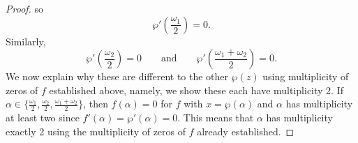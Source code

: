 \documentclass{article}
\theoremstyle{definition}
\theoremstyle{definition}
\theoremstyle{definition}
\begin{document}
\begin{proof}
so 
$$\wp'(\frac{\omega_1}2)=0.$$ Similarly, $$\wp'(\frac{\omega_2}2)=0\qquad \text{and}\qquad \wp'(\frac{\omega_1+\omega_2}2)=0.$$ 
We now explain why these are different to the other $\wp(z)$ using multiplicity of zeros of $f$ established above, namely, we show these each have multiplicity 2. If $\alpha\in\{\frac{\omega_1}2,\frac{\omega_2}2,\frac{\omega_1+\omega_2}2\}$, then $f(\alpha)=0$ for $f$ with $x=\wp(\alpha)$ and $\alpha$ has multiplicity at least two since $f'(\alpha)=\wp'(\alpha)=0$. This means that $\alpha$ has multiplicity exactly 2 using the multiplicity of zeros of $f$ already established.
\newline\newline




\end{proof}
\end{document}
